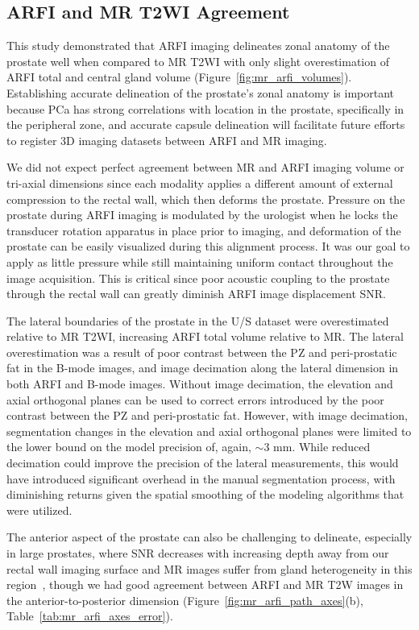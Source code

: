 \subsection{ARFI and MR T2WI Agreement}
This study demonstrated that ARFI imaging delineates zonal anatomy of the
prostate well when compared to MR T2WI with only slight overestimation of ARFI
total and central gland volume (Figure~\ref{fig:mr_arfi_volumes}).
Establishing accurate delineation of the prostate's zonal anatomy is important
because PCa has strong correlations with location in the prostate, specifically
in the peripheral zone, and accurate capsule delineation will facilitate
future efforts to register 3D imaging datasets between ARFI and MR imaging. 

We did not expect perfect agreement between MR and ARFI imaging volume or
tri-axial dimensions since each modality applies a different amount of external
compression to the rectal wall, which then deforms the prostate.  Pressure on
the prostate during ARFI imaging is modulated by the urologist when he locks
the transducer rotation apparatus in place prior to imaging, and deformation of
the prostate can be easily visualized during this alignment process.  It was
our goal to apply as little pressure while still maintaining uniform contact
throughout the image acquisition. This is critical since poor acoustic coupling
to the prostate through the rectal wall can greatly diminish ARFI image
displacement SNR.

The lateral boundaries of the prostate in the U/S dataset were overestimated
relative to MR T2WI, increasing ARFI total volume relative to MR. The lateral
overestimation was a result of poor contrast between the PZ and peri-prostatic
fat in the B-mode images, and image decimation along the lateral dimension in
both ARFI and B-mode images. Without image decimation, the elevation and axial
orthogonal planes can be used to correct errors introduced by the poor contrast
between the PZ and peri-prostatic fat. However, with image decimation,
segmentation changes in the elevation and axial orthogonal planes were limited
to the lower bound on the model precision of, again, $\sim$3 mm.  While reduced
decimation could improve the precision of the lateral measurements, this would
have introduced significant overhead in the manual segmentation process, with
diminishing returns given the spatial smoothing of the modeling algorithms that
were utilized. 

The anterior aspect of the prostate can also be challenging to delineate,
especially in large prostates, where SNR decreases with increasing depth away
from our rectal wall imaging surface and MR images suffer from gland
heterogeneity in this region~\cite{Gupta2013}, though we had good agreement
between ARFI and MR T2W images in the anterior-to-posterior dimension
(Figure~\ref{fig:mr_arfi_path_axes}(b), Table~\ref{tab:mr_arfi_axes_error}).

